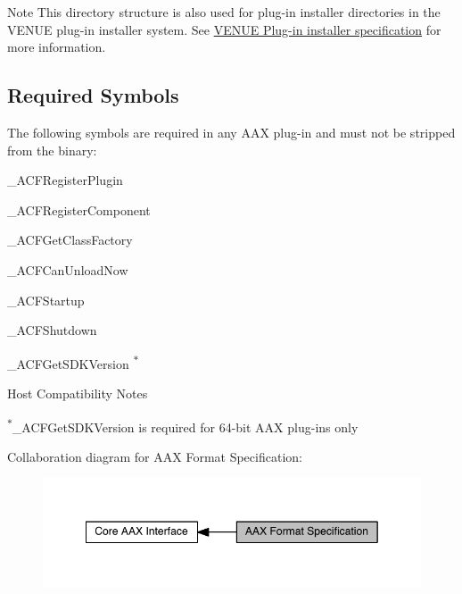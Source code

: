 \begin{DoxyNote}{Note}
This directory structure is also used for plug-\/in installer directories in the V\+E\+N\+U\+E plug-\/in installer system. See \hyperlink{a00377_aax_venue_guide__installer}{V\+E\+N\+U\+E Plug-\/in installer specification} for more information.
\end{DoxyNote}


 \hypertarget{a00331_commoninterface_formatspecification__required_symbols}{}\subsection{Required Symbols}\label{a00331_commoninterface_formatspecification__required_symbols}
The following symbols are required in any A\+A\+X plug-\/in and must not be stripped from the binary\+: 
\begin{DoxyItemize}
\item {\ttfamily \+\_\+\+A\+C\+F\+Register\+Plugin } 
\item {\ttfamily \+\_\+\+A\+C\+F\+Register\+Component } 
\item {\ttfamily \+\_\+\+A\+C\+F\+Get\+Class\+Factory } 
\item {\ttfamily \+\_\+\+A\+C\+F\+Can\+Unload\+Now } 
\item {\ttfamily \+\_\+\+A\+C\+F\+Startup } 
\item {\ttfamily \+\_\+\+A\+C\+F\+Shutdown } 
\item {\ttfamily \+\_\+\+A\+C\+F\+Get\+S\+D\+K\+Version }\textsuperscript{$\ast$} 
\end{DoxyItemize}

\begin{DoxyRefDesc}{Host Compatibility Notes}
\item[\hyperlink{a00380__compatibility_notes000004}{Host Compatibility Notes}]\textsuperscript{$\ast$}{\ttfamily \+\_\+\+A\+C\+F\+Get\+S\+D\+K\+Version} is required for 64-\/bit A\+A\+X plug-\/ins only\end{DoxyRefDesc}


 Collaboration diagram for A\+A\+X Format Specification\+:
\nopagebreak
\begin{figure}[H]
\begin{center}
\leavevmode
\includegraphics[width=349pt]{a00331}
\end{center}
\end{figure}
